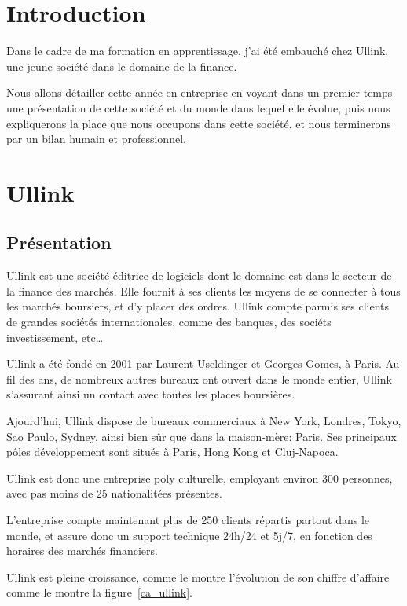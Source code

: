 \documentclass[a4paper, 12pt]{article}
\begin{document}

\pagebreak


\section*{Introduction}

Dans le cadre de ma formation en apprentissage, j'ai été embauché chez Ullink, une jeune société dans le domaine de la finance.

Nous allons détailler cette année en entreprise en voyant dans un premier temps une présentation de cette société et du monde dans lequel elle évolue, puis nous expliquerons la place que nous occupons dans cette société, et nous terminerons par un bilan humain et professionnel.

\pagebreak
\tableofcontents
\pagebreak
\section{Ullink}
\subsection{Présentation}
Ullink est une société éditrice de logiciels dont le domaine est dans le secteur de la finance des marchés. Elle fournit à ses clients les moyens de se connecter à tous les marchés boursiers, et d'y placer des ordres. Ullink compte parmis ses clients de grandes sociétés internationales, comme des banques, des sociéts investissement, etc\dots

Ullink a été fondé en 2001 par Laurent Useldinger et Georges Gomes, à Paris. Au fil des ans, de nombreux autres bureaux ont ouvert dans le monde entier, Ullink s'assurant ainsi un contact avec toutes les places boursières.

Ajourd'hui, Ullink dispose de bureaux commerciaux à New York, Londres, Tokyo, Sao Paulo, Sydney, ainsi bien sûr que dans la maison-mère: Paris. Ses principaux pôles développement sont situés à Paris, Hong Kong et Cluj-Napoca.

Ullink est donc une entreprise poly culturelle, employant environ 300 personnes, avec pas moins de 25 nationalitées présentes.

L'entreprise compte maintenant plus de 250 clients répartis partout dans le monde, et assure donc un support technique 24h/24 et 5j/7, en fonction des horaires des marchés financiers.

Ullink est pleine croissance, comme le montre l'évolution de son chiffre d'affaire comme le montre la figure~\ref{ca_ullink}.
\end{document}
